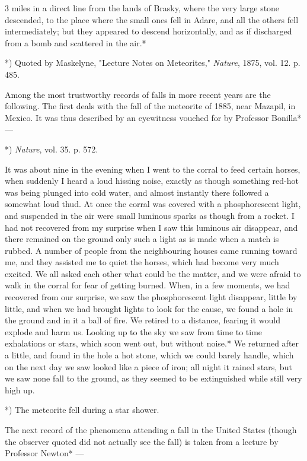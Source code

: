 \documentclass[a4paper, 12pt, oneside, polutonikogreek, english]{article}
\begin{document}
3 miles in a direct line from the lands of Brasky, where the very large stone descended, to the place where the small ones fell in Adare, and all the others fell intermediately; but they appeared to descend horizontally, and as if discharged from a bomb and scattered in the air.*

*) Quoted by Maskelyne, "Lecture Notes on Meteorites," \emph{Nature}, 1875, vol. 12. p. 485.

Among the most trustworthy records of falls in more recent years are the following. The first deals with the fall of the meteorite of 1885, near Mazapil, in Mexico. It was thus described by an eyewitness vouched for by Professor Bonilla* ---

*) \emph{Nature}, vol. 35. p. 572.

It was about nine in the evening when I went to the corral to feed certain horses, when suddenly I heard a loud hissing noise, exactly as though something red-hot was being plunged into cold water, and almost instantly there followed a somewhat loud thud. At once the corral was covered with a phosphorescent light, and suspended in the air were small luminous sparks as though from a rocket. I had not recovered from my surprise when I saw this luminous air disappear, and there remained on the ground only such a light as is made when a match is rubbed. A number of people from the neighbouring houses came running toward me, and they assisted me to quiet the horses, which had become very much excited. We all asked each other what could be the matter, and we were afraid to walk in the corral for fear of getting burned. When, in a few moments, we had recovered from our surprise, we saw the phosphorescent light disappear, little by little, and when we had brought lights to look for the cause, we found a hole in the ground and in it a ball of fire. We retired to a distance, fearing it would explode and harm us. Looking up to the sky we saw from time to time exhalations or stars, which soon went out, but without noise.* We returned after a little, and found in the hole a hot stone, which we could barely handle, which on the next day we saw looked like a piece of iron; all night it rained stars, but we saw none fall to the ground, as they seemed to be extinguished while still very high up.

*) The meteorite fell during a star shower.

The next record of the phenomena attending a fall in the United States (though the observer quoted did not actually see the fall) is taken from a lecture by Professor Newton* ---
\end{document}
